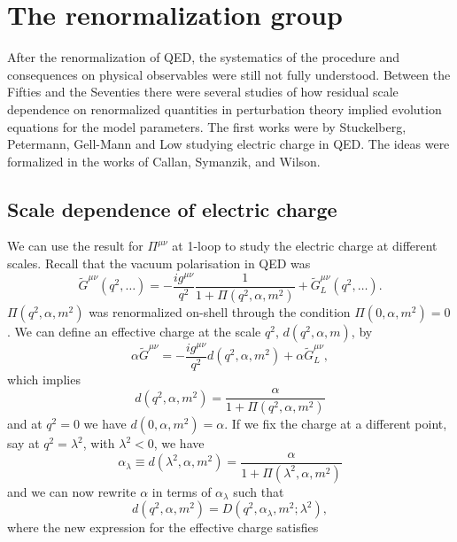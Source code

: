 \chapter{The renormalization group}
After the renormalization of QED, the systematics of the procedure and consequences on physical observables were still not fully understood. Between the Fifties and the Seventies there were several studies of how residual scale dependence on renormalized quantities in perturbation theory implied evolution equations for the model parameters. The first works were by Stuckelberg, Petermann, Gell-Mann and Low studying electric charge in QED. The ideas were formalized in the works of Callan, Symanzik, and Wilson. 

\section{Scale dependence of electric charge}
We can use the result for $\Pi^{\mu\nu}$ at 1-loop to study the electric charge at different scales. Recall that the vacuum polarisation in QED was
\begin{equation}
    \tilde{G}^{\mu\nu}(q^2,\dots) = -\frac{ig^{\mu\nu}}{q^2}\frac{1}{1 + \Pi(q^2,\alpha,m^2)} + \tilde{G}_L^{\mu\nu}(q^2,\dots).
\end{equation}
$\Pi(q^2,\alpha,m^2)$ was renormalized on-shell through the condition $\Pi(0,\alpha,m^2) = 0$. We can define an effective charge at the scale $q^2$, $d(q^2,\alpha,m)$, by
\begin{equation}
    \alpha\tilde{G}^{\mu\nu} = -\frac{ig^{\mu\nu}}{q^2}d(q^2,\alpha,m^2) + \alpha\tilde{G}^{\mu\nu}_L,
\end{equation}
which implies 
\begin{equation}
    d(q^2,\alpha,m^2) = \frac{\alpha}{1 + \Pi(q^2,\alpha,m^2)}
\end{equation}
and at $q^2 = 0$ we have $d(0,\alpha,m^2) = \alpha$. If we fix the charge at a different point, say at $q^2 = \lambda^2$, with $\lambda^2 < 0$, we have
\begin{equation}
    \alpha_\lambda \equiv d(\lambda^2,\alpha,m^2) = \frac{\alpha}{1 + \Pi(\lambda^2,\alpha,m^2)}
\end{equation}
and we can now rewrite $\alpha$ in terms of $\alpha_\lambda$ such that 
\begin{equation}
\label{eq: effective charge I}
    d(q^2,\alpha,m^2) = D(q^2,\alpha_\lambda,m^2;\lambda^2),
\end{equation}
where the new expression for the effective charge satisfies 
